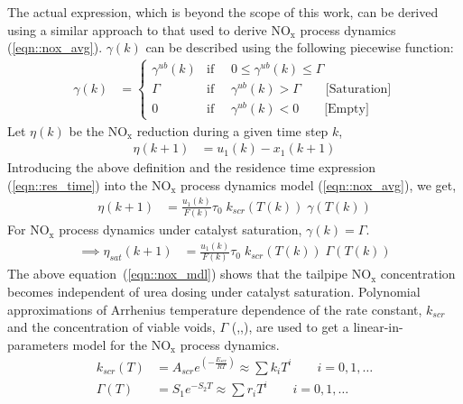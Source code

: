 \documentclass[subscriptcorrection,upint,varvw,barcolor=Goldenrod3,mathalfa=cal=euler,balance,hyphenate,french,pdf-a]{asmejour}
\newcommand{\lr}[1]{\left( #1 \right)}
\newcommand{\nox}{\text{NO}_{\text{x}}}
\begin{document}
The actual expression, which is beyond the scope of this work, can be derived using a similar approach to that used to derive
$\nox$ process dynamics (\ref{eqn::nox_avg}). $\gamma(k)$ can be described using the following piecewise
function:
\begin{align}
        \gamma(k) & =
        \begin{cases}
                \gamma^{ub}(k) & \text{if } \quad 0 \leq \gamma^{ub}(k) \leq \Gamma                  \\
                \Gamma         & \text{if } \quad \gamma^{ub}(k) > \Gamma \qquad \text{[Saturation]} \\
                0              & \text{if } \quad \gamma^{ub}(k) < 0 \qquad \text{[Empty]}
        \end{cases}
\end{align}
Let $\eta(k)$ be the $\nox$ reduction during a given time step $k$,
\begin{align}
        \eta (k+1) & = u_1(k) - x_1(k+1)
\end{align}
Introducing the above definition and the residence time expression (\ref{eqn::res_time}) into the $\nox$ process dynamics model (\ref{eqn::nox_avg}), we get,
\begin{align}
        \eta (k+1) & =   \frac{u_1(k)}{F(k)} \tau_0 \; k_{scr}(T(k)) \; \gamma (T(k)) \label{eqn::flow_scaled_nox_eff}
\end{align}
For $\nox$ process dynamics under catalyst saturation, $\gamma(k) = \Gamma$.
\begin{align}
        \implies \eta_{sat} (k+1) & =  \frac{u_1(k)}{F(k)} \tau_0 \; k_{scr}(T(k)) \; \Gamma (T(k))
        \label{eqn::nox_mdl}
\end{align}
The above equation~(\ref{eqn::nox_mdl}) shows that the tailpipe $\nox$ concentration becomes independent of urea dosing under catalyst saturation. Polynomial approximations of Arrhenius temperature dependence of the rate constant, $k_{scr}$ and the concentration of viable voids, $\Gamma$ (\cite{nova2014urea},\cite{ciardelli2004scr},\cite{joo2008study}), are used to get a linear-in-parameters model for the $\nox$ process dynamics.
\begin{align}
        k_{scr}(T) & = A_{scr} e^{\lr{-\frac{E_{scr}}{RT}}} \approx \sum k_i T^i  \qquad i = 0, 1, \hdots
        \label{eqn::rate_const}                                                                           \\
        \Gamma(T)  & = S_1 e^{-S_2 T} \approx \sum r_i T^i \qquad i = 0, 1, \hdots
        \label{eqn::gamma}
\end{align}
\end{document}
